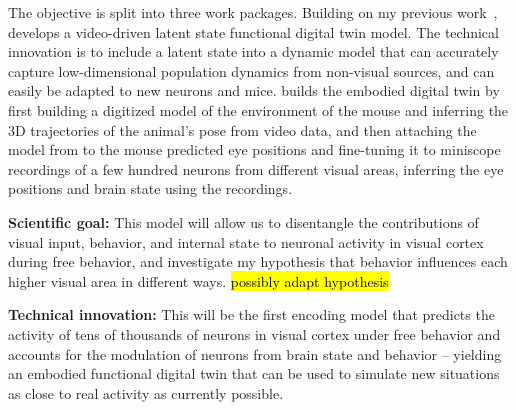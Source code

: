 \documentclass[B2,COG]{ercgrant}
\begin{document}
The objective is split into three work packages. 
Building on my previous work~\parencite{Sinz2018-sk, Bashiri2021-or},  develops a video-driven latent state functional digital twin model. 
The technical innovation is to include a latent state into a dynamic model that can accurately capture low-dimensional population dynamics from non-visual sources, and can easily be adapted to new neurons and mice. 
 builds the embodied digital twin by first building a digitized model of the environment of the mouse and inferring the 3D trajectories of the animal's pose from video data, and then attaching the model from  to the mouse predicted eye positions and fine-tuning it to  miniscope recordings of a few hundred neurons from different visual areas, inferring the eye positions and brain state using the recordings. 

\textbf{Scientific goal:} This model will allow us to disentangle the contributions of visual input, behavior, and internal state to neuronal activity in visual cortex during free behavior, and investigate my hypothesis that behavior influences each higher visual area in different ways. \hl{possibly adapt hypothesis}

\textbf{Technical innovation:} This will be the first encoding model that predicts the activity of tens of thousands of neurons in visual cortex under free behavior and accounts for the modulation of neurons from brain state and behavior -- yielding an embodied functional digital twin that can be used to simulate new situations as close to real activity as currently possible.
\end{document}
